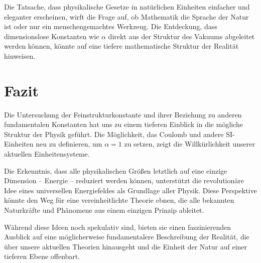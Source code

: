 \documentclass{article}
\begin{document}
	Die Tatsache, dass physikalische Gesetze in natürlichen Einheiten einfacher und eleganter erscheinen, wirft die Frage auf, ob Mathematik die Sprache der Natur ist oder nur ein menschengemachtes Werkzeug. Die Entdeckung, dass dimensionslose Konstanten wie $\alpha$ direkt aus der Struktur des Vakuums abgeleitet werden können, könnte auf eine tiefere mathematische Struktur der Realität hinweisen.
	
	\section{Fazit}
	
	Die Untersuchung der Feinstrukturkonstante und ihrer Beziehung zu anderen fundamentalen Konstanten hat uns zu einem tieferen Einblick in die mögliche Struktur der Physik geführt. Die Möglichkeit, das Coulomb und andere SI-Einheiten neu zu definieren, um $\alpha = 1$ zu setzen, zeigt die Willkürlichkeit unserer aktuellen Einheitensysteme.
	
	Die Erkenntnis, dass alle physikalischen Größen letztlich auf eine einzige Dimension – Energie – reduziert werden können, unterstützt die revolutionäre Idee eines universellen Energiefeldes als Grundlage aller Physik. Diese Perspektive könnte den Weg für eine vereinheitlichte Theorie ebnen, die alle bekannten Naturkräfte und Phänomene aus einem einzigen Prinzip ableitet.
	
	Während diese Ideen noch spekulativ sind, bieten sie einen faszinierenden Ausblick auf eine möglicherweise fundamentalere Beschreibung der Realität, die über unsere aktuellen Theorien hinausgeht und die Einheit der Natur auf einer tieferen Ebene offenbart.
	
\end{document}

